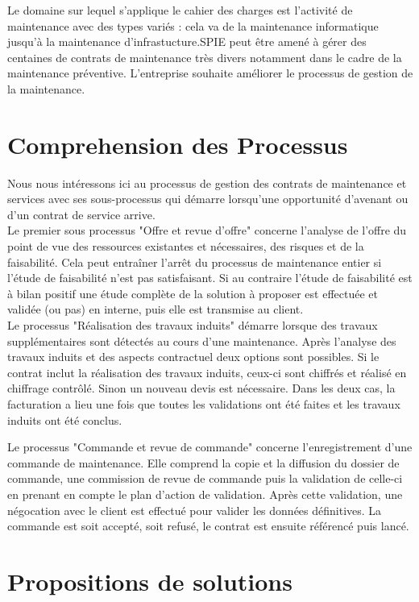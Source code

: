\documentclass[]{scrartcl}
\begin{document}
Le domaine sur lequel s'applique le cahier des charges est l'activité de maintenance avec des types variés : cela va de la maintenance informatique jusqu'à la maintenance d'infrastucture.SPIE peut être amené à gérer des centaines de contrats de maintenance très divers notamment dans le cadre de la maintenance préventive. L'entreprise souhaite améliorer le processus de gestion de la maintenance.  


\section{Comprehension des Processus}
Nous nous intéressons ici au processus de gestion des contrats de maintenance et services avec ses sous-processus qui démarre lorsqu'une opportunité d'avenant ou d'un contrat de service arrive.\\

Le premier sous processus "Offre et revue d'offre" concerne l'analyse de l'offre du point de vue des ressources existantes et nécessaires, des risques et de la faisabilité. Cela peut entraîner l'arrêt du processus de maintenance entier si l'étude de faisabilité n'est pas satisfaisant. Si au contraire l'étude de faisabilité est à bilan positif une étude complète de la solution à proposer est effectuée et validée (ou pas) en interne, puis elle est transmise au client.\\

Le processus "Réalisation des travaux induits" démarre lorsque des travaux supplémentaires sont détectés au cours d'une maintenance. Après l'analyse des travaux induits et des aspects contractuel deux options sont possibles. Si le contrat inclut la réalisation des travaux induits, ceux-ci sont chiffrés et réalisé en chiffrage contrôlé. Sinon un nouveau devis est nécessaire. Dans les deux cas, la facturation a lieu une fois que toutes les validations ont été faites et les travaux induits ont été conclus.

Le processus "Commande et revue de commande" concerne l'enregistrement d'une commande de maintenance. Elle comprend la copie et la diffusion du dossier de commande, une commission de revue de commande puis la validation de celle-ci en prenant en compte le plan d'action de validation. Après cette validation, une négocation avec le client est effectué pour valider les données définitives. La commande est soit accepté, soit refusé, le contrat est ensuite référencé puis lancé.



\section{Propositions de solutions}
\end{document}
